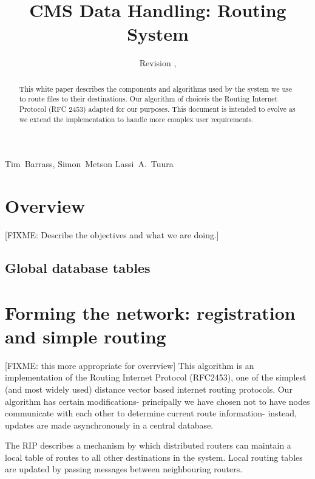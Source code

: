 \documentclass{cmspaper}
\begin{document}
\begin{titlepage}
  \whitepaper
  \date{Revision \RCSRevision, \RCSDate}
  \title{CMS Data Handling: Routing System}

  \begin{Authlist}
    Tim~Barrass, Simon~Metson
    Lassi~A.~Tuura
  \end{Authlist}

  \begin{abstract}
This white paper describes the components and algorithms used by the system we use to route files to their destinations.  Our algorithm of choiceis the Routing Internet Protocol (RFC 2453) adapted for our purposes.  This document is intended to evolve as we extend the implementation to handle more complex user requirements.
  \end{abstract} 

\end{titlepage}

\setcounter{page}{2}

\section{Overview}

[FIXME: Describe the objectives and what we are doing.]

\subsection{Global database tables}

\section{Forming the network: registration and simple routing}
[FIXME: this more appropriate for overrview]
This algorithm is an implementation of the Routing Internet Protocol (RFC2453), one of the simplest (and most widely used) distance vector based internet routing protocols. Our algorithm has certain modifications- principally we have chosen not to have nodes communicate with each other to determine current route information- instead, updates are made asynchronously in a central database.

The RIP describes a mechanism by which distributed routers can maintain a local table of routes to all other destinations in the system. Local routing tables are updated by passing messages between neighbouring routers.
\end{document}
